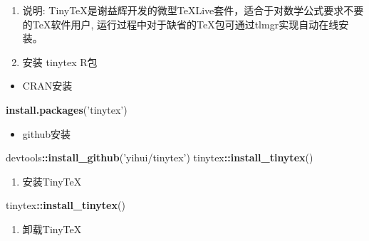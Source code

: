 \documentclass[12pt,a4paper,zihao=-4,UTF8]{book}
\newenvironment{Shaded}{\begin{snugshade}}{\end{snugshade}}
\newcommand{\KeywordTok}[1]{\textcolor[rgb]{0.13,0.29,0.53}{\textbf{#1}}}
\newcommand{\StringTok}[1]{\textcolor[rgb]{0.31,0.60,0.02}{#1}}
\newcommand{\OperatorTok}[1]{\textcolor[rgb]{0.81,0.36,0.00}{\textbf{#1}}}
\newcommand{\NormalTok}[1]{#1}
\providecommand{\tightlist}{%
  \setlength{\itemsep}{0pt}\setlength{\parskip}{0pt}}
\begin{document}
\begin{enumerate}
\def\labelenumi{\arabic{enumi}.}
\item
  说明:
  TinyTeX是谢益辉开发的微型TeXLive套件，适合于对数学公式要求不要的\TeX{}软件用户,
  运行过程中对于缺省的\TeX{}包可通过tlmgr实现自动在线安装。
\item
  安装 tinytex R包
\end{enumerate}

\begin{itemize}
\tightlist
\item
  CRAN安装
\end{itemize}

\begin{Shaded}
\begin{Highlighting}[]
\KeywordTok{install.packages}\NormalTok{(}\StringTok{'tinytex'}\NormalTok{)}
\end{Highlighting}
\end{Shaded}

\begin{itemize}
\tightlist
\item
  github安装
\end{itemize}

\begin{Shaded}
\begin{Highlighting}[]
\NormalTok{devtools}\OperatorTok{::}\KeywordTok{install_github}\NormalTok{(}\StringTok{'yihui/tinytex'}\NormalTok{)}
\NormalTok{tinytex}\OperatorTok{::}\KeywordTok{install_tinytex}\NormalTok{()}
\end{Highlighting}
\end{Shaded}

\begin{enumerate}
\def\labelenumi{\arabic{enumi}.}
\setcounter{enumi}{1}
\tightlist
\item
  安装TinyTeX
\end{enumerate}

\begin{Shaded}
\begin{Highlighting}[]
\NormalTok{tinytex}\OperatorTok{::}\KeywordTok{install_tinytex}\NormalTok{()}
\end{Highlighting}
\end{Shaded}

\begin{enumerate}
\def\labelenumi{\arabic{enumi}.}
\setcounter{enumi}{2}
\tightlist
\item
  卸载TinyTeX
\end{enumerate}
\end{document}
